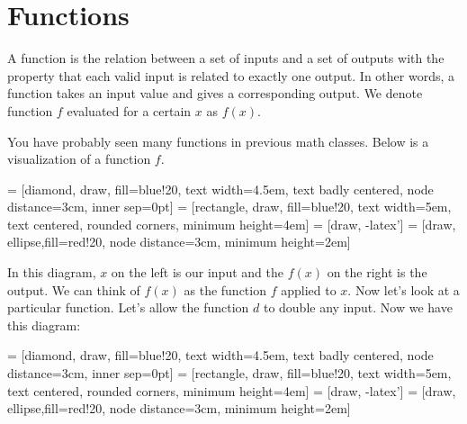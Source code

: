 \chapter{Functions}

\begin{defn}[Function]\label{Function}
A function is the relation between a set of inputs and a set of outputs with the property that each valid input is related to exactly one output. In other words, a function takes  an input value and gives a corresponding output. We denote function $f$ evaluated for a certain $x$ as $f(x)$.
\end{defn}

You have probably seen many functions in previous math classes. Below is a visualization of a function $f$.



\begin{center}
 = [diamond, draw, fill=blue!20, 
    text width=4.5em, text badly centered, node distance=3cm, inner sep=0pt]
 = [rectangle, draw, fill=blue!20, 
    text width=5em, text centered, rounded corners, minimum height=4em]
 = [draw, -latex']
 = [draw, ellipse,fill=red!20, node distance=3cm,
    minimum height=2em]
    
\end{center}

In this diagram, $x$ on the left is our input and the $f(x)$ on the right is the output. We can think of $f(x)$ as the function $f$ applied to $x$. Now let's look at a particular function. Let's allow the function $d$ to double any input. Now we have this diagram:

\begin{center}
 = [diamond, draw, fill=blue!20, 
    text width=4.5em, text badly centered, node distance=3cm, inner sep=0pt]
 = [rectangle, draw, fill=blue!20, 
    text width=5em, text centered, rounded corners, minimum height=4em]
 = [draw, -latex']
 = [draw, ellipse,fill=red!20, node distance=3cm,
    minimum height=2em]

\end{center}

